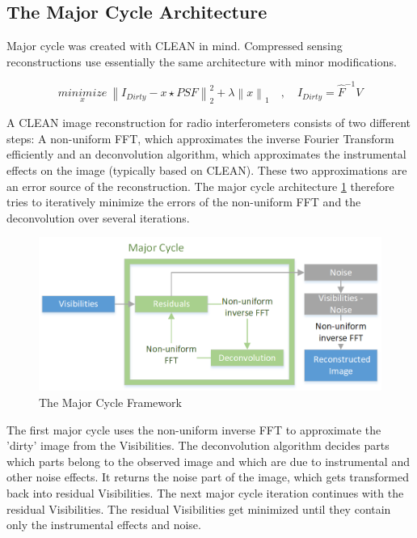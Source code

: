 \subsection{The Major Cycle Architecture}
Major cycle was created with CLEAN in mind. Compressed sensing reconstructions use essentially the same architecture with minor modifications. 

\begin{equation}\label{intro:clean}
\underset{x}{minimize} \: \left \|  I_{Dirty} - x \star PSF \right \|_2^2 + \lambda \left \| x \right \|_1 \quad, \quad I_{Dirty} = \hat{F}^{-1} V
\end{equation}


A CLEAN image reconstruction for radio interferometers consists of two different steps: A non-uniform FFT, which approximates the inverse Fourier Transform efficiently and an deconvolution algorithm, which approximates the instrumental effects on the image (typically based on CLEAN). These two approximations are an error source of the reconstruction. The major cycle architecture \ref{intro:major} therefore tries to iteratively minimize the errors of the non-uniform FFT and the deconvolution over several iterations.

\begin{figure}
	\centering
	\vspace{-10pt}
	\includegraphics[width=1.0\linewidth]{./chapters/01.intro/Major-Minor.png}
	\caption{The Major Cycle Framework}
	\label{intro:major}
	\vspace{-10pt}
\end{figure}

The first major cycle uses the non-uniform inverse FFT to approximate the 'dirty' image from the Visibilities. The deconvolution algorithm decides parts which parts belong to the observed image and which are due to instrumental and other noise effects. It returns the noise part of the image, which gets transformed back into residual Visibilities. The next major cycle iteration continues with the residual Visibilities. The residual Visibilities get minimized until they contain only the instrumental effects and noise.

